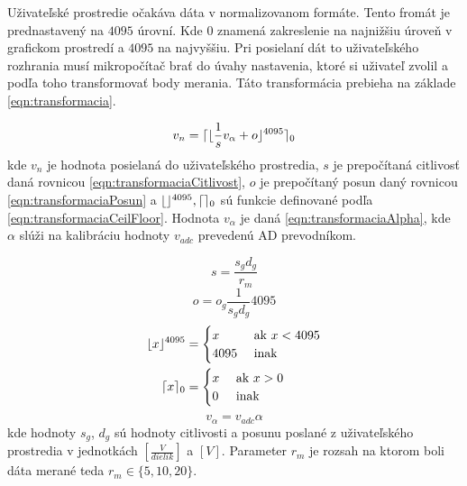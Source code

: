 \documentclass[main.tex]{subfiles}
\begin{document}
	Uživateľské prostredie očakáva dáta v normalizovanom formáte. Tento fromát je prednastavený na $4095$ úrovní. Kde $0$ znamená zakreslenie na najnižšiu úroveň v grafickom prostredí a $4095$ na najvyššiu. Pri posielaní dát to uživateľského rozhrania musí mikropočítač brať do úvahy nastavenia, ktoré si uživateľ zvolil a podľa toho transformovať body merania. Táto transformácia prebieha na základe \cref{eqn:transformacia}. 
	
	\begin{equation}
		v_n = \lceil\lfloor\frac{1}{s}v_\alpha + o\rfloor^{4095}\rceil_{0}
		\label{eqn:transformacia}
	\end{equation}
	kde $v_n$ je hodnota posielaná do uživateľského prostredia, $s$ je prepočítaná citlivosť daná rovnicou \cref{eqn:transformaciaCitlivost}, $o$ je prepočítaný posun daný rovnicou \cref{eqn:transformaciaPosun} a $\lfloor\rfloor^{4095}, \lceil\rceil_{0}$ sú funkcie definované podľa \cref{eqn:transformaciaCeilFloor}. Hodnota $v_{\alpha}$ je daná \cref{eqn:transformaciaAlpha}, kde $\alpha$ slúži na kalibráciu hodnoty $v_{adc}$ prevedenú AD prevodníkom.
	
	\begin{equation}
		s = \frac{s_gd_g}{r_m}
		 \label{eqn:transformaciaCitlivost}
	\end{equation}
	\begin{equation}
		o = o_g\frac{1}{s_gd_g}4095
		\label{eqn:transformaciaPosun}
	\end{equation}
	\begin{equation}
		\begin{split}
			\lfloor x\rfloor^{4095} &= \begin{cases}
				x & \text{ ak } x < 4095 \\
				4095 & \text{ inak } \\
			\end{cases} \\
			\lceil x\rceil_{0} &= \begin{cases}
			x & \text{ ak } x > 0 \\
			0 & \text{ inak } \\
			\end{cases} \\
		\end{split}
	\label{eqn:transformaciaCeilFloor}
	\end{equation}
	\begin{equation}
 	v_{\alpha} = v_{adc} \alpha
	\label{eqn:transformaciaAlpha}
	\end{equation}
	kde hodnoty $s_g$, $d_g$ sú hodnoty citlivosti a posunu poslané z uživateľského prostredia v jednotkách $[\frac{V}{dielik}]$ a $[V]$. Parameter $r_m$ je rozsah na ktorom boli dáta merané teda $r_m \in \{5,10,20\}$.
	
	
	
\end{document}
